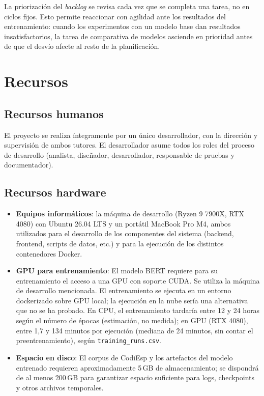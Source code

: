 La priorización del \emph{backlog} se revisa cada vez que se completa una tarea, no en ciclos fijos. Esto permite reaccionar con agilidad ante los resultados del entrenamiento: cuando los experimentos con un modelo base dan resultados insatisfactorios, la tarea de comparativa de modelos asciende en prioridad antes de que el desvío afecte al resto de la planificación.

\section{Recursos}

\subsection{Recursos humanos}

El proyecto se realiza íntegramente por un único desarrollador, con la dirección y supervisión de ambos tutores. El desarrollador asume todos los roles del proceso de desarrollo (analista, diseñador, desarrollador, responsable de pruebas y documentador).

\subsection{Recursos hardware}

\begin{itemize}
 \item \textbf{Equipos informáticos}: la máquina de desarrollo (Ryzen 9 7900X, RTX 4080) con Ubuntu 26.04 LTS y un portátil MacBook Pro M4, ambos utilizados para el desarrollo de los componentes del sistema (backend, frontend, scripts de datos, etc.) y para la ejecución de los distintos contenedores Docker.
 \item \textbf{GPU para entrenamiento}: El modelo BERT requiere para su entrenamiento el acceso a una GPU con soporte CUDA. Se utiliza la máquina de desarrollo mencionada. El entrenamiento se ejecuta en un entorno dockerizado sobre GPU local; la ejecución en la nube sería una alternativa que no se ha probado. En CPU, el entrenamiento tardaría entre 12 y 24 horas según el número de épocas (estimación, no medida); en GPU (RTX 4080), entre 1,7 y 134 minutos por ejecución (mediana de 24 minutos, sin contar el preentrenamiento), según \texttt{training\_runs.csv}.
 \item \textbf{Espacio en disco}: El corpus de CodiEsp y los artefactos del modelo entrenado requieren aproximadamente 5\,GB de almacenamiento; se dispondrá de al menos 200\,GB para garantizar espacio suficiente para logs, checkpoints y otros archivos temporales.
\end{itemize}

